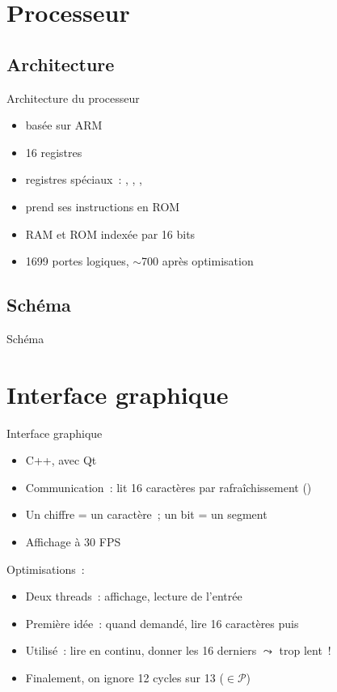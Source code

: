 \documentclass[11pt]{beamer}
\begin{document}
\section{Processeur}

\subsection{Architecture}

\begin{frame}{Architecture du processeur}

\begin{itemize}
\item basée sur ARM
\item 16 registres
\item registres spéciaux~: , , , 
\item prend ses instructions en ROM
\item RAM et ROM indexée par 16 bits
\item 1699 portes logiques, \alert{$\sim$700} après optimisation
\end{itemize}

\end{frame}

\subsection{Schéma}

\begin{frame}{Schéma}

\end{frame}

\section{Interface graphique}

\begin{frame}{Interface graphique}
\begin{itemize}
\item C++, avec Qt
\item Communication~: lit 16 caractères par rafraîchissement ()
\item Un chiffre = un caractère~; un bit = un segment
\item Affichage à 30 FPS
\end{itemize}

\noindent Optimisations~:
\begin{itemize}
\item \alert{Deux threads}~: affichage, lecture de l'entrée
\item Première idée~: quand demandé, lire 16 caractères puis 
\item Utilisé~: lire en continu, donner les 16 derniers $\leadsto$ trop lent~!
\item Finalement, on ignore \alert{12 cycles sur 13} ($\in \mathcal{P}$)
\end{itemize}
\end{frame}
\end{document}
